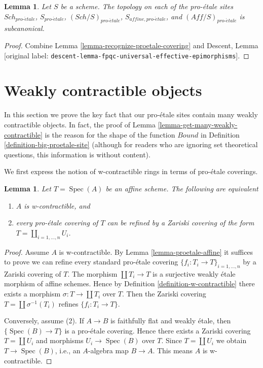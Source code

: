 \documentclass[10pt,a4paper]{article}
\theoremstyle{plain}
\newtheorem{lemma}[subsection]{Lemma}
\theoremstyle{definition}
\theoremstyle{remark}
\numberwithin{equation}{subsection}
\def\Spec{\mathop{\mathrm{Spec}}}
\def\Sch{\mathit{Sch}}
\def\proetale{{pro\text{-}\acute{e}tale}}
\begin{document}
\begin{lemma}
\label{lemma-proetale-subcanonical}
Let $S$ be a scheme. The topology on each of the pro-\'etale sites
$\Sch_\proetale$, $S_\proetale$, $(\Sch/S)_\proetale$,
$S_{affine, \proetale}$, and $(\textit{Aff}/S)_\proetale$ is subcanonical.
\end{lemma}

\begin{proof}
Combine Lemma \ref{lemma-recognize-proetale-covering} and
Descent, Lemma \textnormal{[original label: \nolinkurl{descent-lemma-fpqc-universal-effective-epimorphisms}]}.
\end{proof}





\section{Weakly contractible objects}
\label{section-weakly-contractible}

\noindent
In this section we prove the key fact that our pro-\'etale sites
contain many weakly contractible objects. In fact, the proof of
Lemma \ref{lemma-get-many-weakly-contractible} is the reason for
the shape of the function $Bound$ in
Definition \ref{definition-big-proetale-site} (although
for readers who are ignoring set theoretical questions, this
information is without content).

\noindent
We first express the notion of w-contractible rings in terms of
pro-\'etale coverings.

\begin{lemma}
\label{lemma-w-contractible-proetale-cover}
Let $T = \Spec(A)$ be an affine scheme. The following are equivalent
\begin{enumerate}
\item $A$ is w-contractible, and
\item every pro-\'etale covering of $T$ can be refined by
a Zariski covering of the form $T = \coprod_{i = 1, \ldots, n} U_i$.
\end{enumerate}
\end{lemma}

\begin{proof}
Assume $A$ is w-contractible. By Lemma \ref{lemma-proetale-affine}
it suffices to prove we can refine every standard pro-\'etale covering
$\{f_i : T_i \to T\}_{i = 1, \ldots, n}$ by a Zariski covering of $T$.
The morphism $\coprod T_i \to T$ is a surjective weakly \'etale morphism
of affine schemes. Hence by Definition \ref{definition-w-contractible}
there exists a morphism $\sigma : T \to \coprod T_i$ over $T$.
Then the Zariski covering $T = \coprod \sigma^{-1}(T_i)$
refines $\{f_i : T_i \to T\}$.

\medskip\noindent
Conversely, assume (2). If $A \to B$ is faithfully flat and weakly \'etale,
then $\{\Spec(B) \to T\}$ is a pro-\'etale covering.
Hence there exists a Zariski covering $T = \coprod U_i$
and morphisms $U_i \to \Spec(B)$ over $T$. Since $T = \coprod U_i$
we obtain $T \to \Spec(B)$, i.e., an $A$-algebra map $B \to A$.
This means $A$ is w-contractible.
\end{proof}
\end{document}

